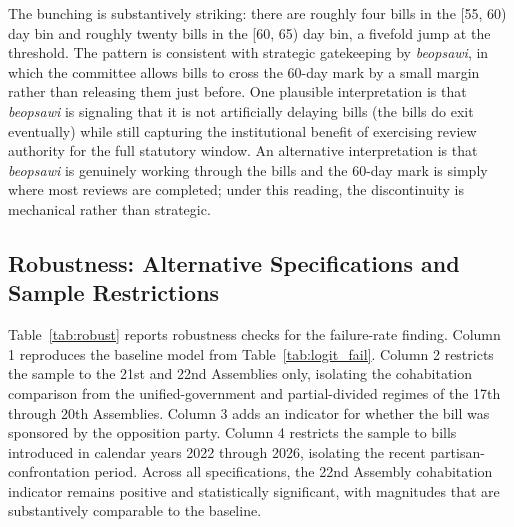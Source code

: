 \documentclass[11pt]{article}
\begin{document}
The bunching is substantively striking: there are roughly four bills in the [55, 60) day bin and roughly twenty bills in the [60, 65) day bin, a fivefold jump at the threshold. The pattern is consistent with strategic gatekeeping by \textit{beopsawi}, in which the committee allows bills to cross the 60-day mark by a small margin rather than releasing them just before. One plausible interpretation is that \textit{beopsawi} is signaling that it is not artificially delaying bills (the bills do exit eventually) while still capturing the institutional benefit of exercising review authority for the full statutory window. An alternative interpretation is that \textit{beopsawi} is genuinely working through the bills and the 60-day mark is simply where most reviews are completed; under this reading, the discontinuity is mechanical rather than strategic.

\subsection{Robustness: Alternative Specifications and Sample Restrictions}

Table~\ref{tab:robust} reports robustness checks for the failure-rate finding. Column 1 reproduces the baseline model from Table~\ref{tab:logit_fail}. Column 2 restricts the sample to the 21st and 22nd Assemblies only, isolating the cohabitation comparison from the unified-government and partial-divided regimes of the 17th through 20th Assemblies. Column 3 adds an indicator for whether the bill was sponsored by the opposition party. Column 4 restricts the sample to bills introduced in calendar years 2022 through 2026, isolating the recent partisan-confrontation period. Across all specifications, the 22nd Assembly cohabitation indicator remains positive and statistically significant, with magnitudes that are substantively comparable to the baseline.
\end{document}
